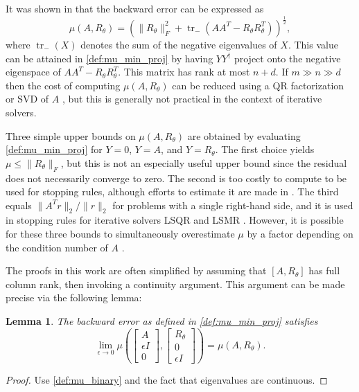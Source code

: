 \documentclass{article}
\newtheorem{lemma}{Lemma}
\newcommand{\tr}{\operatorname{tr}}
\newcommand{\ts}{^T}
\begin{document}
It was shown in \cite[Thm.~4.2]{sun1996optimal} that the backward error can be expressed as
\begin{equation}\label{def:mu_binary}
    \mu(A, R_\theta) = \left(\|R_\theta\|_F^2 + \tr_{-}(AA\ts  - R_\theta R_\theta\ts)\right)^{\frac{1}{2}},
\end{equation}
where $\tr_{-}(X)$ denotes the sum of the negative eigenvalues of $X$. This value can be attained in \cref{def:mu_min_proj} by having $YY^\dagger$ project onto the negative eigenspace of $AA\ts - R_\theta R_\theta\ts$. This matrix has rank at most $n+d$. If $m \gg n \gg d$ then the cost of computing $\mu(A,R_\theta)$ can be reduced using a QR factorization or SVD of $A$ \cite{walden1995optimal,karlson1997estimation}, but this is generally not practical in the context of iterative solvers.

Three simple upper bounds on $\mu(A,R_\theta)$ are obtained by evaluating \cref{def:mu_min_proj} for $Y=0$, $Y=A$, and $Y=R_\theta$. The first choice yields $\mu \leq \|R_\theta\|_F$, but this is not an especially useful upper bound since the residual does not necessarily converge to zero. The second is too costly to compute to be used for stopping rules, although efforts to estimate it are made in \cite{jiranek2010estimating}. The third equals $\|A\ts r\|_2/\|r\|_2$ for problems with a single right-hand side, and it is used in stopping rules for iterative solvers LSQR \cite{paige1982lsqr} and LSMR \cite{fong2011lsmr}. However, it is possible for these three bounds to simultaneously overestimate $\mu$ by a factor depending on the condition number of $A$ \cite{gratton2013simple}. 

The proofs in this work are often simplified by assuming that $[A,R_\theta]$ has full column rank, then invoking a continuity argument. This argument can be made precise via the following lemma:
\begin{lemma}\label{lemma:continuity_argument}
    The backward error as defined in \cref{def:mu_min_proj} satisfies
    \[
    \lim_{\epsilon \rightarrow 0}\mu\left(\begin{bmatrix}
        A \\ \epsilon I \\ 0
    \end{bmatrix}, \begin{bmatrix}
        R_\theta \\ 0 \\ \epsilon I
    \end{bmatrix}\right) = \mu(A, R_\theta). 
    \]
\end{lemma}
\begin{proof}
    Use \cref{def:mu_binary} and the fact that eigenvalues are continuous.
\end{proof}
\end{document}
